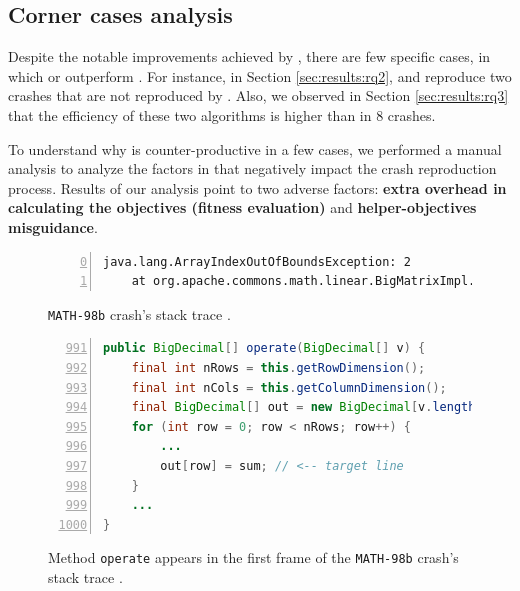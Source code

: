 \subsection{Corner cases analysis}
\label{sec:results:corner}

Despite the notable improvements achieved by \moho, there are few specific cases, in which \SGGA or \decomposition outperform \moho. For instance, in Section \ref{sec:results:rq2}, \SGGA and \decomposition reproduce two crashes that are not reproduced by \moho. Also, we observed in Section \ref{sec:results:rq3} that the efficiency of these two algorithms is higher than \moho in 8 crashes.

To understand why \moho is counter-productive in a few cases, we performed a manual analysis to analyze the factors in \moho that negatively impact the crash reproduction process. Results of our analysis point to two adverse factors: \textbf{extra overhead in calculating the objectives (fitness evaluation)} and \textbf{helper-objectives misguidance}.



\begin{figure}[t]
    \begin{lstlisting}[numbers=left,
        firstnumber=0]
java.lang.ArrayIndexOutOfBoundsException: 2
    at org.apache.commons.math.linear.BigMatrixImpl.operate(BigMatrixImpl.java:997)
    \end{lstlisting}
    \caption{\texttt{MATH-98b} crash's stack trace \cite{just2014defects4j}.}
    \label{lst:factor1-stacktrace}
\end{figure}


\begin{figure}[t]
    \begin{lstlisting}[numbers=left,
        firstnumber=991,
        language=Java,
        basicstyle=\footnotesize]
public BigDecimal[] operate(BigDecimal[] v) {
    final int nRows = this.getRowDimension();
    final int nCols = this.getColumnDimension();
    final BigDecimal[] out = new BigDecimal[v.length];
    for (int row = 0; row < nRows; row++) {
        ...
        out[row] = sum; // <-- target line 
    }
    ...
}
    \end{lstlisting}
    \caption{Method \texttt{operate} appears in the first frame of the \texttt{MATH-98b} crash's stack trace \cite{just2014defects4j}.}
    \label{lst:factor1-code}
\end{figure}


